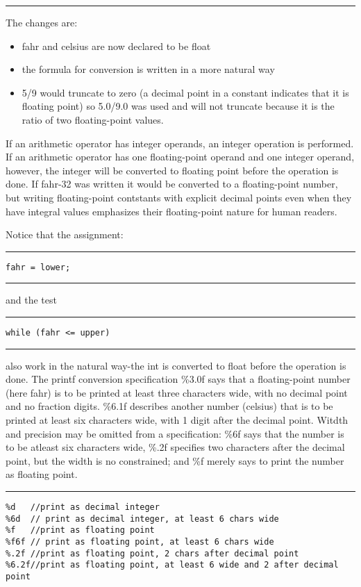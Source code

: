 \documentclass[a4paper]{article}
\begin{document}
\noindent\rule{\textwidth}{0.5pt}

The changes are:
\begin{itemize}
\item fahr and celsius are now declared to be float
\item the formula for conversion is written in a more natural way
\item 5/9 would truncate to zero (a decimal point in a constant indicates that it is
floating point) so 5.0/9.0 was used and will not truncate because it is the
ratio of two floating-point values.
\end{itemize}

If an arithmetic  operator has integer operands, an integer operation is
performed. If an arithmetic operator has one floating-point operand and one
integer operand, however, the integer will be converted to floating point before
the operation is done. If fahr-32 was written it would be converted to a
floating-point number, but writing floating-point contstants with explicit
decimal points even when they have integral values emphasizes their
floating-point nature for human readers.

Notice that the assignment:

\noindent\rule{\textwidth}{0.5pt}
\begin{verbatim}
fahr = lower;
\end{verbatim}

\noindent\rule{\textwidth}{0.5pt}
and the test

\noindent\rule{\textwidth}{0.5pt}
\begin{verbatim}
while (fahr <= upper)
\end{verbatim}

\noindent\rule{\textwidth}{0.5pt}
also work in the natural way-the int is converted to float before the operation
is done.
The printf conversion specification \%3.0f says that a floating-point number
(here fahr) is to be printed at least three characters wide, with no decimal
point and no fraction digits. \%6.1f describes another number (celsius) that is
to be printed at least six characters wide, with 1 digit after the decimal
point.
Witdth and precision may be omitted from a specification: \%6f says that the
number is to be atleast six characters wide, \%.2f specifies two characters after
the decimal point, but the width is no constrained; and \%f merely says to print
the number as floating point.

\noindent\rule{\textwidth}{0.5pt}
\begin{verbatim}
%d   //print as decimal integer
%6d  // print as decimal integer, at least 6 chars wide
%f   //print as floating point
%f6f // print as floating point, at least 6 chars wide
%.2f //print as floating point, 2 chars after decimal point
%6.2f//print as floating point, at least 6 wide and 2 after decimal point
\end{verbatim}
\end{document}
